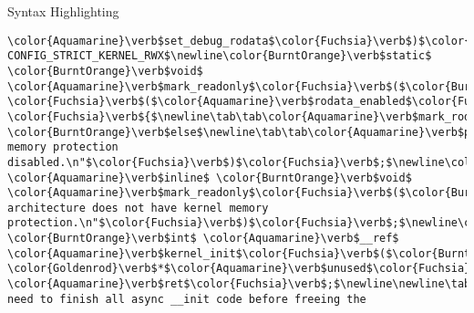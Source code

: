 \begin{frame}{Syntax Highlighting}
\begin{verbatim}
\color{Aquamarine}\verb$set_debug_rodata$\color{Fuchsia}\verb$)$\color{Fuchsia}\verb$;$\newline\color{Gray}\verb$#endif$\newline\newline\color{Gray}\verb$#ifdef CONFIG_STRICT_KERNEL_RWX$\newline\color{BurntOrange}\verb$static$ \color{BurntOrange}\verb$void$ \color{Aquamarine}\verb$mark_readonly$\color{Fuchsia}\verb$($\color{BurntOrange}\verb$void$\color{Fuchsia}\verb$)$\newline\color{Fuchsia}\verb${$\newline\tab\color{BurntOrange}\verb$if$ \color{Fuchsia}\verb$($\color{Aquamarine}\verb$rodata_enabled$\color{Fuchsia}\verb$)$ \color{Fuchsia}\verb${$\newline\tab\tab\color{Aquamarine}\verb$mark_rodata_ro$\color{Fuchsia}\verb$($\color{Fuchsia}\verb$)$\color{Fuchsia}\verb$;$\newline\tab\tab\color{Aquamarine}\verb$rodata_test$\color{Fuchsia}\verb$($\color{Fuchsia}\verb$)$\color{Fuchsia}\verb$;$\newline\tab\color{Fuchsia}\verb$}$ \color{BurntOrange}\verb$else$\newline\tab\tab\color{Aquamarine}\verb$pr_info$\color{Fuchsia}\verb$($\color{Emerald}\verb$"Kernel memory protection disabled.\n"$\color{Fuchsia}\verb$)$\color{Fuchsia}\verb$;$\newline\color{Fuchsia}\verb$}$\newline\color{Gray}\verb$#else$\newline\color{BurntOrange}\verb$static$ \color{Aquamarine}\verb$inline$ \color{BurntOrange}\verb$void$ \color{Aquamarine}\verb$mark_readonly$\color{Fuchsia}\verb$($\color{BurntOrange}\verb$void$\color{Fuchsia}\verb$)$\newline\color{Fuchsia}\verb${$\newline\tab\color{Aquamarine}\verb$pr_warn$\color{Fuchsia}\verb$($\color{Emerald}\verb$"This architecture does not have kernel memory protection.\n"$\color{Fuchsia}\verb$)$\color{Fuchsia}\verb$;$\newline\color{Fuchsia}\verb$}$\newline\color{Gray}\verb$#endif$\newline\newline\color{BurntOrange}\verb$static$ \color{BurntOrange}\verb$int$ \color{Aquamarine}\verb$__ref$ \color{Aquamarine}\verb$kernel_init$\color{Fuchsia}\verb$($\color{BurntOrange}\verb$void$ \color{Goldenrod}\verb$*$\color{Aquamarine}\verb$unused$\color{Fuchsia}\verb$)$\newline\color{Fuchsia}\verb${$\newline\tab\color{BurntOrange}\verb$int$ \color{Aquamarine}\verb$ret$\color{Fuchsia}\verb$;$\newline\newline\tab\color{Aquamarine}\verb$kernel_init_freeable$\color{Fuchsia}\verb$($\color{Fuchsia}\verb$)$\color{Fuchsia}\verb$;$\newline\tab\color{Rhodamine}\begin{verbatim}/* need to finish all async __init code before freeing the 
\end{verbatim}
\end{frame}
